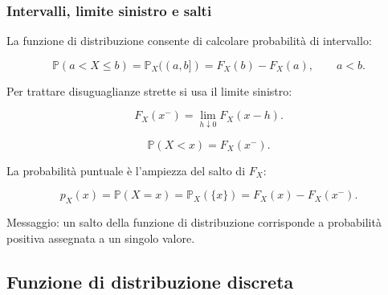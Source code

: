 \documentclass[handout]{beamer}%
\providecommand{\Prob}{\mathbb{P}}
\providecommand{\1}{\mathbf{1}}
\providecommand{\QTR}[2]{\csname #1\endcsname{#2}}
\begin{document}
\begin{frame}%
%

\frametitle{Intervalli, limite sinistro e salti}%


La funzione di distribuzione consente di calcolare probabilit\`{a} di intervallo:%

\[
\Prob(a<X\leq b)=\Prob_{X}((a,b]) = F_{X}(b)-F_{X}(a), \qquad a<b.
\]


\medskip

Per trattare disuguaglianze strette si usa il limite sinistro:%

\[
F_{X}(x^{-}) = \lim_{h\downarrow0}F_{X}(x-h).
\]
%

\[
\Prob(X<x)=F_{X}(x^{-}).
\]


\medskip

La probabilit\`{a} puntuale \`{e} l'ampiezza del salto di $F_{X}$:%

\[
p_{X}(x) = \Prob(X=x) = \Prob_{X}(\{x\}) = F_{X}(x)-F_{X}(x^{-}).
\]


\medskip

Messaggio: un salto della funzione di distribuzione corrisponde a
probabilit\`{a} positiva assegnata a un singolo valore.%

\transboxout
\end{frame}%




\subsection{Funzione di distribuzione discreta}%
\end{document}
